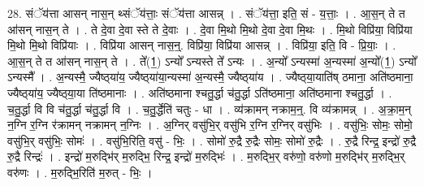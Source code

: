 \documentclass[17pt]{extarticle}
\begin{document}
28. संॅय॑त्ता आसन् नास॒न् थ्संॅय॑त्ताः॒ संॅय॑त्ता आसन्न् । . संॅय॑त्ता॒ इति॒ सं - य॒त्ताः॒ । . आ॒स॒न् ते त आ॑सन् नास॒न् ते । . ते दे॒वा दे॒वा स्ते ते दे॒वाः । . दे॒वा मि॒थो मि॒थो दे॒वा दे॒वा मि॒थः । . मि॒थो विप्रि॑या॒ विप्रि॑या मि॒थो मि॒थो विप्रि॑याः । . विप्रि॑या आसन् नास॒न्॒. विप्रि॑या॒ विप्रि॑या आसन्न् । . विप्रि॑या॒ इति॒ वि - प्रि॒याः॒ । . आ॒स॒न् ते त आ॑सन् नास॒न् ते । . ते᳚(1॒) ऽन्यो᳚ ऽन्यस्ते ते᳚ ऽन्यः । . अ॒न्यो᳚ ऽन्यस्मा॑ अ॒न्यस्मा॑ अ॒न्यो᳚(1॒) ऽन्यो᳚ ऽन्यस्मै᳚ । . अ॒न्यस्मै॒ ज्यैष्ठ्‍या॑य॒ ज्यैष्ठ्‍या॑या॒न्यस्मा॑ अ॒न्यस्मै॒ ज्यैष्ठ्‍या॑य । . ज्यैष्ठ्‍या॒याति॑ष् ठमाना॒ अति॑ष्ठमाना॒ ज्यैष्ठ्‍या॑य॒ ज्यैष्ठ्‍या॒या ति॑ष्ठमानाः । . अति॑ष्ठमाना श्चतु॒र्द्धा च॑तु॒र्द्धा ऽति॑ष्ठमाना॒ अति॑ष्ठमाना श्चतु॒र्द्धा । . च॒तु॒र्द्धा वि वि च॑तु॒र्द्धा च॑तु॒र्द्धा वि । . च॒तु॒र्द्धेति॑ चतुः - धा । . व्य॑क्रामन् नक्राम॒न्॒. वि व्य॑क्रामन्न् । . अ॒क्रा॒म॒न् न॒ग्नि र॒ग्नि र॑क्रामन् नक्रामन् न॒ग्निः । . अ॒ग्निर् वसु॑भि॒र् वसु॑भि र॒ग्नि र॒ग्निर् वसु॑भिः । . वसु॑भिः॒ सोमः॒ सोमो॒ वसु॑भि॒र् वसु॑भिः॒ सोमः॑ । . वसु॑भि॒रिति॒ वसु॑ - भिः॒ । . सोमो॑ रु॒द्रै रु॒द्रैः सोमः॒ सोमो॑ रु॒द्रैः । . रु॒द्रै रिन्द्र॒ इन्द्रो॑ रु॒द्रै रु॒द्रै रिन्द्रः॑ । . इन्द्रो॑ म॒रुद्भि॑र् म॒रुद्भि॒ रिन्द्र॒ इन्द्रो॑ म॒रुद्भिः॑ । . म॒रुद्भि॒र् वरु॑णो॒ वरु॑णो म॒रुद्भि॑र् म॒रुद्भि॒र् वरु॑णः । . म॒रुद्भि॒रिति॑ म॒रुत् - भिः॒ । \newline
\end{document}
